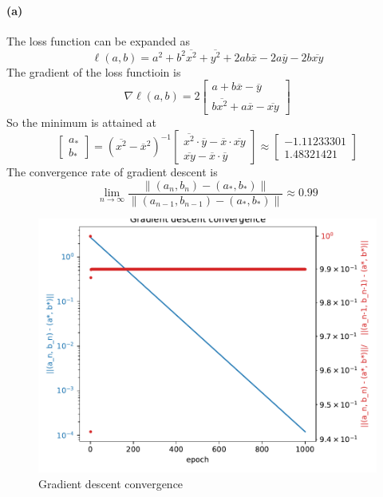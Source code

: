 \documentclass[12pt]{article}
\begin{document}
\paragraph{(a)}
The loss function can be expanded as
\[ \ell(a,b)= a^2 + b^2\overline{x^2}+ \overline{y^2} + 2ab\overline{x} - 2a\overline{y} - 2b \overline{xy} \]
The gradient of the loss functioin is
\[ \nabla\ell(a,b) = 2\begin{bmatrix}
    a+b\overline{x}-\overline{y} \\
    b\overline{x^2}+a\overline{x}-\overline{xy}
\end{bmatrix} \]
So the minimum is attained at
\[ \begin{bmatrix} a_* \\ b_* \end{bmatrix} = \left(\overline{x^2}-\overline{x}^2 \right)^{-1} \begin{bmatrix}
    \overline{x^2}\cdot\overline{y} - \overline{x}\cdot\overline{xy} \\
    \overline{xy} - \overline{x}\cdot\overline{y} \end{bmatrix}
    \approx \begin{bmatrix}  -1.11233301 \\ 1.48321421 \end{bmatrix} \]
The convergence rate of gradient descent is
\[ \lim_{n\to\infty}\frac{\|(a_n,b_n)-(a_*,b_*)\|}{\|(a_{n-1},b_{n-1})-(a_*,b_*)\|}\approx0.99 \]
\begin{figure}[htbp]
    \includegraphics{Homework1/ex2b.pdf}
    \caption{Gradient descent convergence}
\end{figure}
\end{document}
